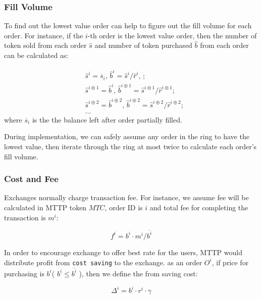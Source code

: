 \documentclass[UTF8,nofonts]{article}
\begin{document}
\subsubsection{Fill Volume\label{sec: matchquantity}}

To find out the lowest value order can help to figure out the fill volume for each order. For instance, if the $i$-th order is the lowest value order, then the number of token sold from each order $\hat{s}$ and number of token purchased $\hat{b}$ from each order can be calculated as:

\[
\begin{split}
&\hat{s}^{i}=\overline{s}_i\text{, } \hat{b}^{i}=\hat{s}^{i}/ \hat{r}^i\text{, }\text{;}\\
&\hat{s}^{i\oplus 1}=\hat{b}^i\text{, } \hat{b}^{i\oplus 1}=\hat{s}^{i\oplus 1}/ \hat{r}^{i\oplus 1}\text{;}\\
&\hat{s}^{i\oplus 2}=\hat{b}^{i\oplus 2}\text{, } \hat{b}^{i\oplus 2}=\hat{s}^{i\oplus 2}/ \hat{r}^{i\oplus 2}\text{;}\\
& ...
\end{split}
\]
where $\overline{s}_i$ is the the balance left after order partially filled.

During implementation, we can safely assume any order in the ring to have the lowest value, then iterate through the ring at most twice to calculate each order's fill volume. 

\subsubsection{Cost and Fee\label{sec: fee}}

Exchanges normally charge transaction fee. For instance,  we assume fee will be calculated in MTTP token $MTC$, order ID is $i$ and total fee for completing the transaction is $m^i$: 

\begin{equation*}
f^i = b^i \cdot m^i / \overline{b^i}
\end{equation*}


In order to encourage exchange to offer best rate for the users,  MTTP would distribute profit from \texttt{cost saving} to the exchange. as an order $O^i$,  if price for purchasing is $b^i$( $b^i \le \overline{b^i}$ ),  then we define the from saving cost: 

\begin{equation*}
\Delta^i = b^i \cdot r^i \cdot \gamma
\end{equation*}
\end{document}
